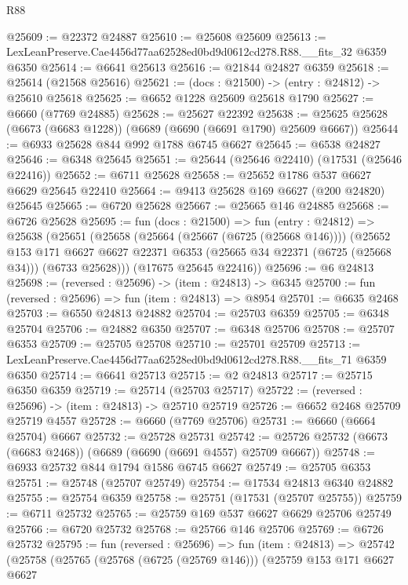 \begin{lexlean}{R88}
\begin{coremodule}
@25609 := @22372 @24887
@25610 := @25608 @25609
@25613 := LexLeanPreserve.Cae4456d77aa62528ed0bd9d0612cd278.R88.__fits_32 @6359 @6350
@25614 := @6641 @25613
@25616 := @21844 @24827 @6359
@25618 := @25614 (@21568 @25616)
@25621 := (docs : @21500) -> (entry : @24812) -> @25610 @25618
@25625 := @6652 @1228 @25609 @25618 @1790
@25627 := @6660 (@7769 @24885)
@25628 := @25627 @22392
@25638 := @25625 @25628 (@6673 (@6683 @1228)) (@6689 (@6690 (@6691 @1790) @25609 @6667))
@25644 := @6933 @25628 @844 @992 @1788 @6745 @6627
@25645 := @6538 @24827
@25646 := @6348 @25645
@25651 := @25644 (@25646 @22410) (@17531 (@25646 @22416))
@25652 := @6711 @25628
@25658 := @25652 @1786 @537 @6627 @6629 @25645 @22410
@25664 := @9413 @25628 @169 @6627 (@200 @24820) @25645
@25665 := @6720 @25628
@25667 := @25665 @146 @24885
@25668 := @6726 @25628
@25695 := fun (docs : @21500) =>
  fun (entry : @24812) =>
  @25638
    (@25651
      (@25658
        (@25664 (@25667 (@6725 (@25668 @146))))
        (@25652
          @153
          @171
          @6627
          @6627
          @22371
          @6353
          (@25665 @34 @22371 (@6725 (@25668 @34)))
          (@6733 @25628)))
      (@17675 @25645 @22416))
@25696 := @6 @24813
@25698 := (reversed : @25696) -> (item : @24813) -> @6345
@25700 := fun (reversed : @25696) => fun (item : @24813) => @8954
@25701 := @6635 @2468
@25703 := @6550 @24813 @24882
@25704 := @25703 @6359
@25705 := @6348 @25704
@25706 := @24882 @6350
@25707 := @6348 @25706
@25708 := @25707 @6353
@25709 := @25705 @25708
@25710 := @25701 @25709
@25713 := LexLeanPreserve.Cae4456d77aa62528ed0bd9d0612cd278.R88.__fits_71 @6359 @6350
@25714 := @6641 @25713
@25715 := @2 @24813
@25717 := @25715 @6350 @6359
@25719 := @25714 (@25703 @25717)
@25722 := (reversed : @25696) -> (item : @24813) -> @25710 @25719
@25726 := @6652 @2468 @25709 @25719 @4557
@25728 := @6660 (@7769 @25706)
@25731 := @6660 (@6664 @25704) @6667
@25732 := @25728 @25731
@25742 := @25726 @25732 (@6673 (@6683 @2468)) (@6689 (@6690 (@6691 @4557) @25709 @6667))
@25748 := @6933 @25732 @844 @1794 @1586 @6745 @6627
@25749 := @25705 @6353
@25751 := @25748 (@25707 @25749)
@25754 := @17534 @24813 @6340 @24882
@25755 := @25754 @6359
@25758 := @25751 (@17531 (@25707 @25755))
@25759 := @6711 @25732
@25765 := @25759 @169 @537 @6627 @6629 @25706 @25749
@25766 := @6720 @25732
@25768 := @25766 @146 @25706
@25769 := @6726 @25732
@25795 := fun (reversed : @25696) =>
  fun (item : @24813) =>
  @25742
    (@25758
      (@25765
        (@25768 (@6725 (@25769 @146)))
        (@25759
          @153
          @171
          @6627
          @6627

\end{coremodule}
\end{lexlean}
